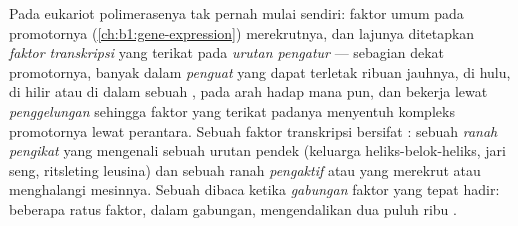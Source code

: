 \begin{definition}\label{def:b1:expression-control:enhancer}
Pada eukariot polimerasenya tak pernah mulai sendiri: faktor umum pada
promotornya (\cref{ch:b1:gene-expression}) merekrutnya, dan lajunya
ditetapkan \emph{faktor transkripsi} yang terikat pada \emph{urutan
pengatur} --- sebagian dekat promotornya, banyak dalam \emph{penguat}
yang dapat terletak ribuan  jauhnya, di hulu, di hilir
atau di dalam sebuah , pada arah hadap mana pun, dan bekerja
lewat \emph{penggelungan}  sehingga faktor yang terikat padanya
menyentuh kompleks promotornya lewat  perantara. Sebuah faktor
transkripsi bersifat : sebuah \emph{ranah pengikat } yang
mengenali sebuah urutan pendek (keluarga heliks-belok-heliks, jari
seng, ritsleting leusina) dan sebuah ranah \emph{pengaktif} atau
\emph{} yang merekrut atau menghalangi mesinnya. Sebuah 
dibaca ketika \emph{gabungan} faktor yang tepat hadir: beberapa ratus
faktor, dalam gabungan, mengendalikan dua puluh ribu .
\end{definition}

